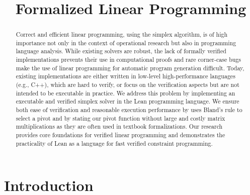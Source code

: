 \documentclass[11pt]{article} %
\title{Formalized Linear Programming}
\date{}
\begin{document}

\lstset{language=lean}
\lstset{basicstyle=\normalsize}
\maketitle
\begin{abstract}
Correct and efficient linear programming, using the simplex
algorithm, is of high importance not only in the context of
operational research but also in programming language analysis.
While existing solvers are robust, the lack of formally verified
implementations prevents their use in computational proofs and
rare corner-case bugs make the use of linear programming for
automatic program generation difficult.
Today, existing implementations are either written in low-level
high-performance languages (e.g., C++), which are hard to verify, or
focus on the verification aspects but are not intended to be executable in practice.
We address this problem by implementing an executable and verified
simplex solver in the Lean programming language.
We ensure both ease of verification and reasonable execution
performance by uses Bland's rule to select a pivot and by stating our
pivot function without large and costly matrix multiplications as
they are often used in textbook formalizations.
Our research provides core foundations for verified linear
programming and demonstrates the practicality of Lean as a language
for fast verified constraint programming.

\end{abstract}

\section{Introduction}
\end{document}
